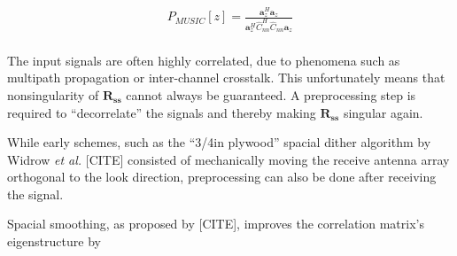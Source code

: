 \begin{align}
    P_{MUSIC}[z] = \frac{\mathbf{a}_z^H \mathbf{a}_z}{\mathbf{a}_z^H\hat C_{nn}^H\hat C_{nn}\mathbf{a}_z}
\end{align} \\

The input signals are often highly correlated, due to phenomena such as multipath propagation or inter-channel crosstalk.
This unfortunately means that nonsingularity of $\mathbf{R_{ss}}$ cannot always be guaranteed.
A preprocessing step is required to ``decorrelate'' the signals and thereby making $\mathbf{R_{ss}}$ singular again.

While early schemes, such as the ``3/4in plywood'' spacial dither algorithm by Widrow \textit{et al.} [CITE]
consisted of mechanically moving the receive antenna array orthogonal to the look direction,
preprocessing can also be done after receiving the signal.

Spacial smoothing, as proposed by [CITE], improves the correlation matrix's eigenstructure by
